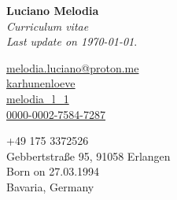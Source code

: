 \documentclass[a4paper,11pt]{article}
\begin{document}
{
  {
  \Huge \textbf{Luciano Melodia}}\\[0.1cm]
  \emph{Curriculum vitae}\\
  \emph{Last update on \today}.

  \begin{flushleft}
    \scriptsize
      \begin{minipage}{0.3\textwidth}
        {\footnotesize \faEnvelope} \hspace{0.1cm} \href{mailto:melodia.luciano@proton.me}{melodia.luciano@proton.me}\\[0.05cm]
        {\footnotesize \faGithub} \hspace{0.15cm} \href{https://github.com/karhunenloeve}{karhunenloeve}\\[0.05cm]
        {\footnotesize \aiarXiv} \hspace{0.1cm} \href{https://arxiv.org/a/melodia_l_1}{melodia\_l\_1}\\[0.05cm]
        {\footnotesize \aiOrcid} \hspace{0.1cm} \href{https://orcid.org/0000-0002-7584-7287}{0000-0002-7584-7287}
      \end{minipage}
      \begin{minipage}{0.4\textwidth}
        {\footnotesize \faPhone} \hspace{0.15cm} +49 175 3372526 \\[0.05cm]
        {\footnotesize \faMapPin} \hspace{0.23cm} Gebbertstraße 95, 91058 Erlangen\\[0.05cm]
        {\footnotesize \faMars} \hspace{0.1cm} Born on 27.03.1994\\[0.05cm]
        {\footnotesize \faMapO} \hspace{0.1cm} Bavaria, Germany
      \end{minipage}
  \end{flushleft}
}

\end{document}

